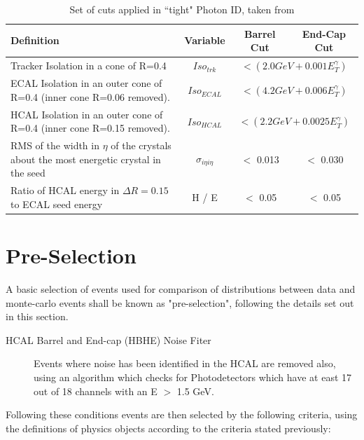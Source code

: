 \begin{table}[htbp]
\centering
\begin{tabular}{ m{6.9cm}  c  c  c}
\hline
\hline
 \centering Definition & Variable & Barrel Cut & End-Cap Cut \\
\hline
\hline
Tracker Isolation in a cone of R=0.4 & $Iso_{trk}$ & \multicolumn{2}{c}{$< (2.0 GeV + 0.001E_{T}^{\gamma})$}\\
ECAL Isolation in an outer cone of R=0.4 (inner cone R=0.06 removed). & $Iso_{ECAL}$ & \multicolumn{2}{c}{$< (4.2 GeV + 0.006E_{T}^{\gamma})$}\\

HCAL Isolation in an outer cone of R=0.4 (inner cone R=0.15 removed). & $Iso_{HCAL}$ & \multicolumn{2}{c}{$< (2.2 GeV + 0.0025E_{T}^{\gamma})$}\\

RMS of the width in $\eta$ of the crystals about the most energetic crystal in the seed& $\sigma_{i \eta i \eta}$ & $<$ 0.013 & $<$ 0.030\\
Ratio of HCAL energy in $\Delta R = 0.15$ to ECAL seed energy & H / E & $<$ 0.05 & $<$ 0.05\\
\hline
\end{tabular}
\caption{\label{tab:pid} Set of cuts applied in ``tight" Photon ID, taken from \cite{EGM-10-006}}
\end{table}

\section{Pre-Selection}
\label{sec:press}
A basic selection of events used for comparison of distributions between data and monte-carlo events shall be known as "pre-selection",  following the details set out in this section.

\begin{description}


\item[HCAL Barrel and End-cap (HBHE) Noise Fiter]{Events where noise has been identified in the HCAL are removed also, using an algorithm which checks for Photodetectors which have at east 17 out of 18 channels with an E $>$ 1.5 GeV.}
\end{description}
Following these conditions events are then selected by the following criteria, using the definitions of physics objects according to the criteria stated previously:

